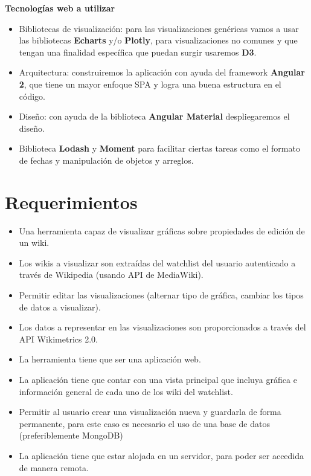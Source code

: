 \textbf{Tecnologías web a utilizar}
\begin{itemize}
\item Bibliotecas de visualización: para las visualizaciones genéricas vamos a usar las bibliotecas \textbf{Echarts} y/o \textbf{Plotly}, para visualizaciones no comunes y que tengan una finalidad específica que puedan surgir usaremos \textbf{D3}.
\item Arquitectura: construiremos la aplicación con ayuda del framework \textbf{Angular 2}, que tiene un mayor enfoque SPA y logra una buena estructura en el código.
\item Diseño: con ayuda de la biblioteca \textbf{Angular Material} despliegaremos el diseño.
\item Biblioteca \textbf{Lodash} y \textbf{Moment} para facilitar ciertas tareas como el formato de fechas y manipulación de objetos y arreglos.
\\[5pt]
\end{itemize}

\section{Requerimientos}
\begin{itemize}
\item Una herramienta capaz de visualizar gráficas sobre propiedades de edición de un wiki.
\item Los wikis a visualizar son extraídas del watchlist del usuario autenticado a través de Wikipedia (usando API de MediaWiki).
\item Permitir editar las visualizaciones (alternar tipo de gráfica, cambiar los tipos de datos a visualizar).
\item Los datos a representar en las visualizaciones son proporcionados a través del API Wikimetrics 2.0.
\item La herramienta tiene que ser una aplicación web.
\item La aplicación tiene que contar con una vista principal que incluya gráfica e información general de cada uno de los wiki del watchlist.
\item Permitir al usuario crear una visualización nueva y guardarla de forma permanente, para este caso es necesario el uso de una base de datos (preferiblemente MongoDB)
\item La aplicación tiene que estar alojada en un servidor, para poder ser accedida de manera remota.
\\[5pt]
\end{itemize}

